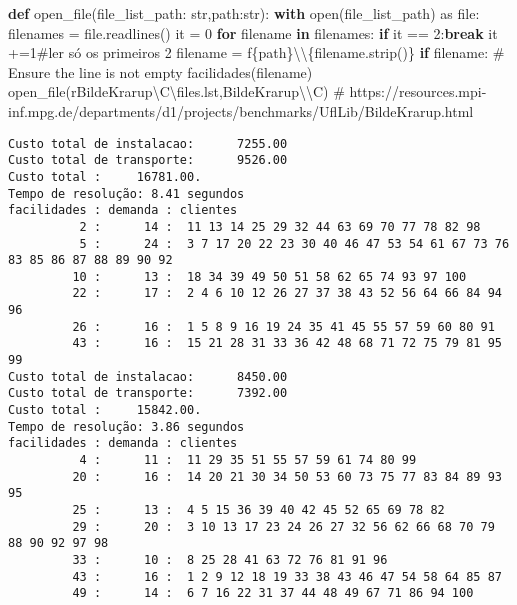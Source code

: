 \documentclass[
  letterpaper,
  DIV=11,
  numbers=noendperiod]{scrartcl}
\newenvironment{Shaded}{\begin{snugshade}}{\end{snugshade}}
\newcommand{\BuiltInTok}[1]{\textcolor[rgb]{0.00,0.23,0.31}{#1}}
\newcommand{\CharTok}[1]{\textcolor[rgb]{0.13,0.47,0.30}{#1}}
\newcommand{\CommentTok}[1]{\textcolor[rgb]{0.37,0.37,0.37}{#1}}
\newcommand{\ControlFlowTok}[1]{\textcolor[rgb]{0.00,0.23,0.31}{\textbf{#1}}}
\newcommand{\DecValTok}[1]{\textcolor[rgb]{0.68,0.00,0.00}{#1}}
\newcommand{\ImportTok}[1]{\textcolor[rgb]{0.00,0.46,0.62}{#1}}
\newcommand{\KeywordTok}[1]{\textcolor[rgb]{0.00,0.23,0.31}{\textbf{#1}}}
\newcommand{\NormalTok}[1]{\textcolor[rgb]{0.00,0.23,0.31}{#1}}
\newcommand{\OperatorTok}[1]{\textcolor[rgb]{0.37,0.37,0.37}{#1}}
\newcommand{\SpecialCharTok}[1]{\textcolor[rgb]{0.37,0.37,0.37}{#1}}
\newcommand{\SpecialStringTok}[1]{\textcolor[rgb]{0.13,0.47,0.30}{#1}}
\newcommand{\StringTok}[1]{\textcolor[rgb]{0.13,0.47,0.30}{#1}}
\newcommand{\VerbatimStringTok}[1]{\textcolor[rgb]{0.13,0.47,0.30}{#1}}
\begin{document}
\begin{Shaded}
\begin{Highlighting}[]
\KeywordTok{def}\NormalTok{ open\_file(file\_list\_path: }\BuiltInTok{str}\NormalTok{,path:}\BuiltInTok{str}\NormalTok{):}
    \ControlFlowTok{with} \BuiltInTok{open}\NormalTok{(file\_list\_path) }\ImportTok{as} \BuiltInTok{file}\NormalTok{:}
\NormalTok{        filenames }\OperatorTok{=} \BuiltInTok{file}\NormalTok{.readlines()}
\NormalTok{    it }\OperatorTok{=} \DecValTok{0}
    \ControlFlowTok{for}\NormalTok{ filename }\KeywordTok{in}\NormalTok{ filenames:}
        \ControlFlowTok{if}\NormalTok{ it }\OperatorTok{==} \DecValTok{2}\NormalTok{:}\ControlFlowTok{break}
\NormalTok{        it }\OperatorTok{+=}\DecValTok{1}\CommentTok{\#ler só os primeiros 2 }
\NormalTok{        filename }\OperatorTok{=} \SpecialStringTok{f\textquotesingle{}}\SpecialCharTok{\{}\NormalTok{path}\SpecialCharTok{\}}\CharTok{\textbackslash{}\textbackslash{}}\SpecialCharTok{\{}\NormalTok{filename}\SpecialCharTok{.}\NormalTok{strip()}\SpecialCharTok{\}}\SpecialStringTok{\textquotesingle{}}
        \ControlFlowTok{if}\NormalTok{ filename:  }\CommentTok{\# Ensure the line is not empty}
\NormalTok{            facilidades(filename)}
\NormalTok{open\_file(}\VerbatimStringTok{r\textquotesingle{}BildeKrarup\textbackslash{}C\textbackslash{}files.lst\textquotesingle{}}\NormalTok{,}\StringTok{\textquotesingle{}BildeKrarup}\CharTok{\textbackslash{}\textbackslash{}}\StringTok{C\textquotesingle{}}\NormalTok{)}
\CommentTok{\# https://resources.mpi{-}inf.mpg.de/departments/d1/projects/benchmarks/UflLib/BildeKrarup.html}
\end{Highlighting}
\end{Shaded}

\begin{verbatim}
Custo total de instalacao:      7255.00
Custo total de transporte:      9526.00 
Custo total :     16781.00.
Tempo de resolução: 8.41 segundos
facilidades : demanda : clientes 
          2 :      14 :  11 13 14 25 29 32 44 63 69 70 77 78 82 98 
          5 :      24 :  3 7 17 20 22 23 30 40 46 47 53 54 61 67 73 76 83 85 86 87 88 89 90 92 
         10 :      13 :  18 34 39 49 50 51 58 62 65 74 93 97 100 
         22 :      17 :  2 4 6 10 12 26 27 37 38 43 52 56 64 66 84 94 96 
         26 :      16 :  1 5 8 9 16 19 24 35 41 45 55 57 59 60 80 91 
         43 :      16 :  15 21 28 31 33 36 42 48 68 71 72 75 79 81 95 99 
Custo total de instalacao:      8450.00
Custo total de transporte:      7392.00 
Custo total :     15842.00.
Tempo de resolução: 3.86 segundos
facilidades : demanda : clientes 
          4 :      11 :  11 29 35 51 55 57 59 61 74 80 99 
         20 :      16 :  14 20 21 30 34 50 53 60 73 75 77 83 84 89 93 95 
         25 :      13 :  4 5 15 36 39 40 42 45 52 65 69 78 82 
         29 :      20 :  3 10 13 17 23 24 26 27 32 56 62 66 68 70 79 88 90 92 97 98 
         33 :      10 :  8 25 28 41 63 72 76 81 91 96 
         43 :      16 :  1 2 9 12 18 19 33 38 43 46 47 54 58 64 85 87 
         49 :      14 :  6 7 16 22 31 37 44 48 49 67 71 86 94 100 
\end{verbatim}
\end{document}
